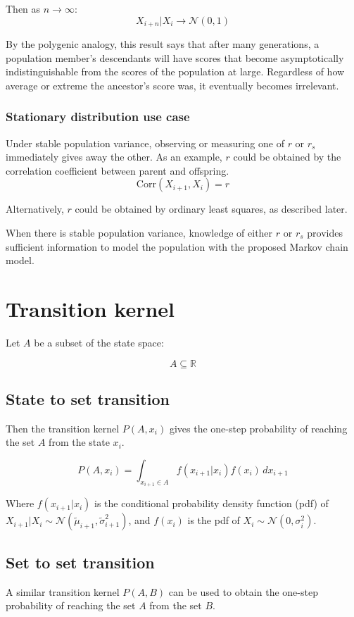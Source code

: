 \documentclass[a4paper,11pt]{article}
\begin{document}
Then as $n \rightarrow \infty$:
$$X_{i+n}|X_i \rightarrow \mathcal{N}(0, 1)$$

By the polygenic analogy, this result says that after many generations, a population member's descendants will have scores that become asymptotically indistinguishable from the scores of the population at large. Regardless of how average or extreme the ancestor's score was, it eventually becomes irrelevant.


\subsubsection{Stationary distribution use case}
Under stable population variance, observing or measuring one of $r$ or $r_s$ immediately gives away the other. As an example, $r$ could be obtained by the correlation coefficient between parent and offspring.  
$$\mathrm{Corr}(X_{i+1}, X_i) = r$$

Alternatively, $r$ could be obtained by ordinary least squares, as described later.

When there is stable population variance, knowledge of either $r$ or $r_s$ provides sufficient information to model the population with the proposed Markov chain model.


\section{Transition kernel}

Let $A$ be a subset of the state space:

$$A \subseteq \mathbb{R}$$

\subsection{State to set transition}
Then the transition kernel $P(A, x_i)$ gives the one-step probability of reaching the set $A$ from the state $x_i$. 

$$P(A, x_i) = \int_{x_{i+1}\in A}^{} f(x_{i+1}|x_i)f(x_i) \, dx_{i+1}$$

Where $f(x_{i+1}|x_i)$ is the conditional probability density function (pdf) of $X_{i+1}|X_i \sim \mathcal{N}(\tilde{\mu}_{i+1}, \tilde{\sigma}_{i+1}^2)$, and $f(x_i)$ is the pdf of $X_i \sim \mathcal{N}(0, \sigma_i^2)$.

\subsection{Set to set transition}
A similar transition kernel $P(A, B)$ can be used to obtain the one-step probability of reaching the set $A$ from the set $B$. 
\end{document}
